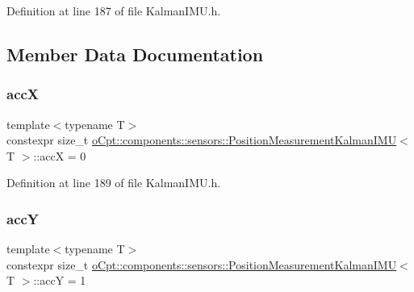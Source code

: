 Definition at line 187 of file Kalman\+I\+M\+U.\+h.



\subsection{Member Data Documentation}
\hypertarget{classo_cpt_1_1components_1_1sensors_1_1_position_measurement_kalman_i_m_u_abe279287f350be4995f13f72c673625a}{}\label{classo_cpt_1_1components_1_1sensors_1_1_position_measurement_kalman_i_m_u_abe279287f350be4995f13f72c673625a} 
\subsubsection{\texorpdfstring{accX}{accX}}
{\footnotesize\ttfamily template$<$typename T$>$ \\
constexpr size\+\_\+t \hyperlink{classo_cpt_1_1components_1_1sensors_1_1_position_measurement_kalman_i_m_u}{o\+Cpt\+::components\+::sensors\+::\+Position\+Measurement\+Kalman\+I\+MU}$<$ T $>$\+::accX = 0\hspace{0.3cm}{\ttfamily [static]}}



Definition at line 189 of file Kalman\+I\+M\+U.\+h.

\hypertarget{classo_cpt_1_1components_1_1sensors_1_1_position_measurement_kalman_i_m_u_aacd79fa1a1072b859caa23872affe32c}{}\label{classo_cpt_1_1components_1_1sensors_1_1_position_measurement_kalman_i_m_u_aacd79fa1a1072b859caa23872affe32c} 
\subsubsection{\texorpdfstring{accY}{accY}}
{\footnotesize\ttfamily template$<$typename T$>$ \\
constexpr size\+\_\+t \hyperlink{classo_cpt_1_1components_1_1sensors_1_1_position_measurement_kalman_i_m_u}{o\+Cpt\+::components\+::sensors\+::\+Position\+Measurement\+Kalman\+I\+MU}$<$ T $>$\+::accY = 1\hspace{0.3cm}{\ttfamily [static]}}



